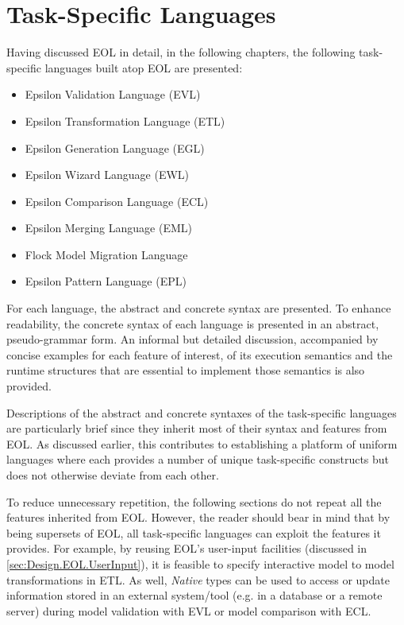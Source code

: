 \section{Task-Specific Languages}
\label{sec:TaskSpecificLanguages}

Having discussed EOL in detail, in the following chapters, the following task-specific languages built atop EOL are presented:

\begin{itemize}
	\item Epsilon Validation Language (EVL)
	\item Epsilon Transformation Language (ETL)
	\item Epsilon Generation Language (EGL)
	\item Epsilon Wizard Language (EWL)
	\item Epsilon Comparison Language (ECL)
	\item Epsilon Merging Language (EML)
	\item Flock Model Migration Language
	\item Epsilon Pattern Language (EPL)
\end{itemize}

For each language, the abstract and concrete syntax are presented. To enhance readability, the concrete syntax of each language is presented in an abstract, pseudo-grammar form. An informal but detailed discussion, accompanied by concise examples for each feature of interest, of its execution semantics and the runtime structures that are essential to implement those semantics is also provided.

Descriptions of the abstract and concrete syntaxes of the task-specific languages are particularly brief since they inherit most of their syntax and features from EOL. As discussed earlier, this contributes to establishing a platform of uniform languages where each provides a number of unique task-specific constructs but does not otherwise deviate from each other.

To reduce unnecessary repetition, the following sections do not repeat all the features inherited from EOL. However, the reader should bear in mind that by being supersets of EOL, all task-specific languages can exploit the features it provides. For example, by reusing EOL's user-input facilities (discussed in \ref{sec:Design.EOL.UserInput}), it is feasible to specify interactive model to model transformations in ETL. As well, \emph{Native} types can be used to access or update information stored in an external system/tool (e.g. in a database or a remote server) during model validation with EVL or model comparison with ECL.


